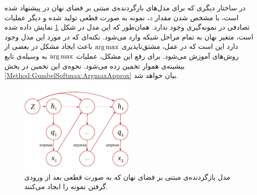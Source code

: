  \newline
 در ساختار دیگری که برای مدل‌های بازگردنده‌ی مبتنی بر فضای نهان در
 \cite{Zhang2017TextGAN}
  پیشنهاد شده است، با مشخص شدن مقدار $z$، نمونه به صورت قطعی تولید شده و دیگر عملیات تصادفی در نمونه‌گیری وجود ندارد. 
  همان‌طور که این مدل در شکل 
  \ref{Figure:GenrativeModel:Architecture:RecurrentLatent:Det:Zall}
  نمایش داده شده است، متغیر نهان به تمام مراحل شبکه وارد می‌شود. نکته‌ای که در مورد این مدل وجود دارد این است که در عمل، مشتق‌ناپذیری
  $\operatorname*{arg\,max}$
  باعث ایجاد مشکل در بعضی از روش‌های آموزش می‌شود. برای رفع این مشکل، عملیات $\operatorname*{arg\,max}$ به وسیله‌ی تابع بیشینه‌ی هموار تخمین زده می‌شود. نحوه‌ی این تخمین در بخش
  \ref{Method:GumbelSoftmax:ArgmaxApprox}
  بیان خواهد شد.
  \begin{figure}[!htb]
  	\centering
  	\includegraphics[width=0.5\textwidth]{images/ArchitectureRNNLatentGeneratorArgmax.pdf} 
  	\caption{مدل بازگردنده‌ی مبتنی بر فضای نهان که به صورت قطعی بعد از ورودی گرفتن نمونه را ایجاد می‌کنند.}
  	\label{Figure:GenrativeModel:Architecture:RecurrentLatent:Det:Zall}
  \end{figure}
 
